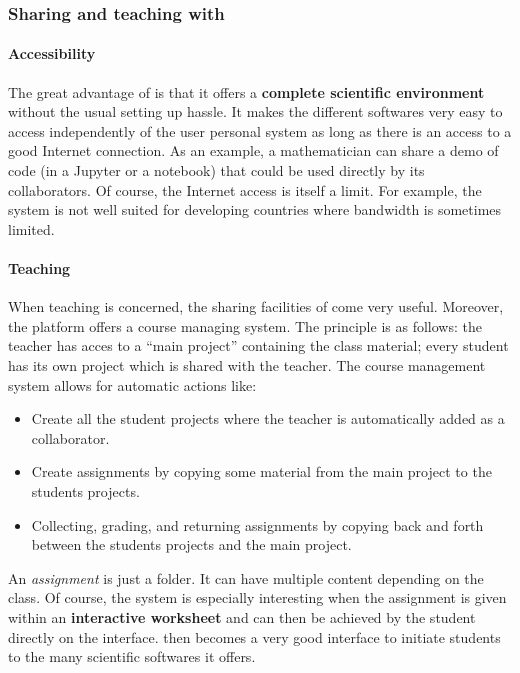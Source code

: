 \documentclass{deliverablereport}
\begin{document}
\subsubsection{Sharing and teaching with \SMC}

\paragraph{Accessibility}

The great advantage of \SMC is that it offers a \textbf{complete
  scientific environment} without the usual setting up hassle. It
makes the different softwares very easy to access independently of the
user personal system as long as there is an access to a good Internet
connection. As an example, a mathematician can share a demo of code (in
a Jupyter or a \Sage notebook) that could be used directly by its
collaborators. Of course, the Internet access is itself a limit. For
example, the system is not well suited for developing countries where
bandwidth is sometimes limited.

\paragraph{Teaching}

When teaching is concerned, the sharing facilities of \SMC come very
useful.  Moreover, the platform offers a course managing system. The
principle is as follows: the teacher has acces to a ``main project''
containing the class material; every student has its own project which
is shared with the teacher. The course management system allows for
automatic actions like:

\begin{itemize}
\item Create all the student projects where the teacher is
  automatically added as a collaborator.
\item Create assignments by copying some material from the main
  project to the students projects.
\item Collecting, grading, and returning assignments by copying back
  and forth between the students projects and the main project.
\end{itemize}

An \emph{assignment} is just a folder. It can have multiple content
depending on the class.  Of course, the system is especially
interesting when the assignment is given within an \textbf{interactive
  worksheet} and can then be achieved by the student directly on the
interface. \SMC then becomes a very good interface to initiate
students to the many scientific softwares it offers.
\end{document}
